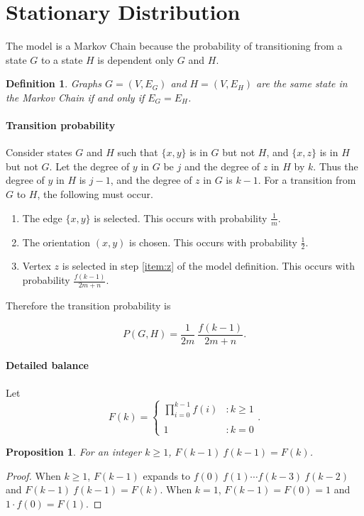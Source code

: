 \documentclass[a4paper,10pt]{article}
\newtheorem{defn}{Definition}
\newtheorem{prop}{Proposition}
\begin{document}
\section{Stationary Distribution}
The model is a Markov Chain because the probability of transitioning from a state $G$ to a state $H$ is dependent only $G$ and $H$. 

\begin{defn}
 Graphs $G = (V, E_G)$ and $H = (V, E_H)$ are the same state in the Markov Chain if and only if $E_G = E_H$.
\end{defn}


\paragraph{Transition probability} Consider states $G$ and $H$ such that $\{x, y\}$ is in $G$ but not $H$, and $\{x, z\}$ is in $H$ but not $G$. Let the degree of $y$ in $G$ be $j$ and the degree of $z$ in $H$ by $k$. Thus the degree of $y$ in $H$ is $j - 1$, and the degree of $z$ in $G$ is $k - 1$.
For a transition from $G$ to $H$, the following must occur.
\begin{enumerate}
 \item The edge $\{x, y\}$ is selected. This occurs with probability $\frac{1}{m}$.
 \item The orientation $(x, y)$ is chosen. This occurs with probability $\frac{1}{2}$.
 \item Vertex $z$ is selected in step \ref{item:z} of the model definition. This occurs with probability $\frac{f(k - 1)}{2m + n}$.
\end{enumerate}

\noindent Therefore the transition probability is 

\begin{equation}
\label{eqn:pgh}
 P(G, H) = \frac{1}{2m} \: \frac{f(k-1)}{2m+n}.
\end{equation}

\paragraph{Detailed balance}
Let 
\begin{equation}
 F(k) = \left\{
     \begin{array}{lr}
  \prod\limits_{i=0}^{k - 1} f(i) & : k \geq 1\\\\
  1 & : k = 0
     \end{array}
   \right..
\end{equation}
\begin{prop}\label{prop:F(k)}
 For an integer $k \geq 1$, $F(k - 1) \: f(k - 1) = F(k)$.
\end{prop}
\begin{proof}
When $k \geq 1$, $F(k - 1)$ expands to $f(0) \: f(1) \cdots f(k - 3) \: f(k - 2)$ and $F(k - 1) \: f(k - 1) = F(k)$. When $k = 1$, $F(k - 1) = F(0) = 1$ and $1 \cdot f(0) = F(1)$.
\end{proof}
\end{document}

